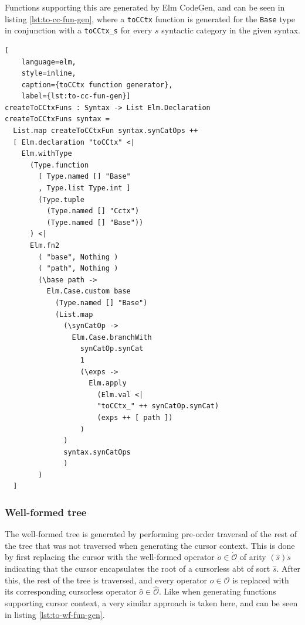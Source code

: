Functions supporting this are generated by Elm CodeGen, and can be seen in
listing \cref{lst:to-cc-fun-gen}, where a \texttt{toCCtx} function is generated
for the \texttt{Base} type in conjunction with a
\texttt{toCCtx\_s} for every $s$ syntactic category in the given syntax.

\begin{lstlisting}[
    language=elm,
    style=inline,
    caption={toCCtx function generator},
    label={lst:to-cc-fun-gen}]
createToCCtxFuns : Syntax -> List Elm.Declaration
createToCCtxFuns syntax =
  List.map createToCCtxFun syntax.synCatOps ++ 
  [ Elm.declaration "toCCtx" <|
    Elm.withType
      (Type.function
        [ Type.named [] "Base"
        , Type.list Type.int ]
        (Type.tuple 
          (Type.named [] "Cctx") 
          (Type.named [] "Base"))
      ) <|
      Elm.fn2
        ( "base", Nothing )
        ( "path", Nothing )
        (\base path ->
          Elm.Case.custom base
            (Type.named [] "Base")
            (List.map
              (\synCatOp ->
                Elm.Case.branchWith
                  synCatOp.synCat
                  1
                  (\exps ->
                    Elm.apply 
                      (Elm.val <|
                      "toCCtx_" ++ synCatOp.synCat) 
                      (exps ++ [ path ])
                  )
              )
              syntax.synCatOps
              )
        )
  ]
\end{lstlisting}

\subsubsection{Well-formed tree}

The well-formed tree is generated by performing pre-order traversal of the
rest of the tree that was not traversed when generating the cursor context.
This is done by first replacing the cursor with the well-formed operator
$\dot{o} \in \dot{\mathcal{O}}$ of arity $(\hat{s})\dot{s}$ indicating that the
cursor encapsulates the root of a cursorless abt of sort $\hat{s}$.
After this, the rest of the tree is traversed, and every operator $o \in \mathcal{O}$
is replaced with its corresponding cursorless operator $\hat{o} \in \hat{\mathcal{O}}$.
Like when generating functions supporting cursor context, a very similar approach
is taken here, and can be seen in listing \cref{lst:to-wf-fun-gen}.

